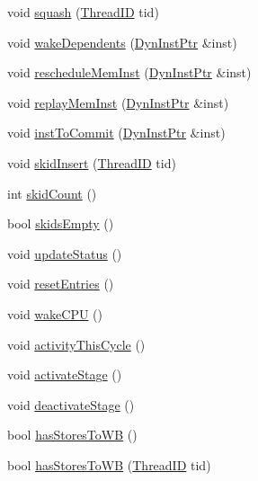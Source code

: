 \begin{DoxyCompactItemize}
\item 
void \hyperlink{classDefaultIEW_ad33d65c18c323d90695d7c2355b49af9}{squash} (\hyperlink{base_2types_8hh_ab39b1a4f9dad884694c7a74ed69e6a6b}{ThreadID} tid)
\item 
void \hyperlink{classDefaultIEW_a84834d31005dcede47e334bfee5b52d3}{wakeDependents} (\hyperlink{classDefaultIEW_a028ce10889c5f6450239d9e9a7347976}{DynInstPtr} \&inst)
\item 
void \hyperlink{classDefaultIEW_aa9c46f45f491ef90a936c7e2b95f20aa}{rescheduleMemInst} (\hyperlink{classDefaultIEW_a028ce10889c5f6450239d9e9a7347976}{DynInstPtr} \&inst)
\item 
void \hyperlink{classDefaultIEW_ae165df775b4de9e9430228c7f04c2bc9}{replayMemInst} (\hyperlink{classDefaultIEW_a028ce10889c5f6450239d9e9a7347976}{DynInstPtr} \&inst)
\item 
void \hyperlink{classDefaultIEW_a720e9865ffa6e84b756f5ec1d1a24d94}{instToCommit} (\hyperlink{classDefaultIEW_a028ce10889c5f6450239d9e9a7347976}{DynInstPtr} \&inst)
\item 
void \hyperlink{classDefaultIEW_ac24515147270ef9b85991bbe13bd47af}{skidInsert} (\hyperlink{base_2types_8hh_ab39b1a4f9dad884694c7a74ed69e6a6b}{ThreadID} tid)
\item 
int \hyperlink{classDefaultIEW_af64dbc63d9980fb739ed89ddadb2b92e}{skidCount} ()
\item 
bool \hyperlink{classDefaultIEW_afe3e2673d17dd5c568862ef5ae68b4d8}{skidsEmpty} ()
\item 
void \hyperlink{classDefaultIEW_a4bb9486757ce225941aaaf759b357a57}{updateStatus} ()
\item 
void \hyperlink{classDefaultIEW_aaf9a05771a835f9f8d634cef36e24d40}{resetEntries} ()
\item 
void \hyperlink{classDefaultIEW_abce3a63b123f84972e4df7962f9b870e}{wakeCPU} ()
\item 
void \hyperlink{classDefaultIEW_ad7e5c2506873e8dc8c71740ac6dabb23}{activityThisCycle} ()
\item 
void \hyperlink{classDefaultIEW_adeab5540b89c1c9defd0d910d9b39e10}{activateStage} ()
\item 
void \hyperlink{classDefaultIEW_aeb7184c554fd889269371c654c7efdb6}{deactivateStage} ()
\item 
bool \hyperlink{classDefaultIEW_ad2e4b46255cfb53e85522adeed4e2089}{hasStoresToWB} ()
\item 
bool \hyperlink{classDefaultIEW_a7e6f40e5ef3dbfe9d3d8da2dbeaf2b91}{hasStoresToWB} (\hyperlink{base_2types_8hh_ab39b1a4f9dad884694c7a74ed69e6a6b}{ThreadID} tid)

\end{DoxyCompactItemize}
